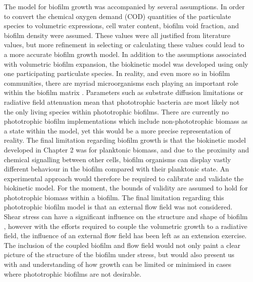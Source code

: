 The model for biofilm growth was accompanied by several assumptions. In order to convert the chemical oxygen demand (COD) quantities of the particulate species to volumetric expressions, cell water content, biofilm void fraction, and biofilm density were assumed. These values were all justified from literature values, but more refinement in selecting or calculating these values could lead to a more accurate biofilm growth model. In addition to the assumptions associated with volumetric biofilm expansion, the biokinetic model was developed using only one participating particulate species. In reality, and even more so in biofilm communities, there are myriad microorganisms each playing an important role within the biofilm matrix \cite{donlan2002}. Parameters such as substrate diffusion limitations or radiative field attenuation mean that phototrophic bacteria are most likely not the only living species within phototrophic biofilms. There are currently no phototrophic biofilm implementations which include non-phototrophic biomass as a state within the model, yet this would be a more precise representation of reality. The final limitation regarding biofilm growth is that the biokinetic model developed in Chapter 2 was for planktonic biomass, and due to the proximity and chemical signalling between other cells, biofilm organisms can display vastly different behaviour in the biofilm compared with their planktonic state. An experimental approach would therefore be required to calibrate and validate the biokinetic model. For the moment, the bounds of validity are assumed to hold for phototrophic biomass within a biofilm. 
\skippingparagraph
The final limitation regarding this phototrophic biofilm model is that an external flow field was not considered. Shear stress can have a significant influence on the structure and shape of biofilm \cite{donlan2002}, however with the efforts required to couple the volumetric growth to a radiative field, the influence of an external flow field has been left as an extension exercise. The inclusion of the coupled biofilm and flow field would not only paint a clear picture of the structure of the biofilm under stress, but would also present us with and understanding of how growth can be limited or minimised in cases where phototrophic biofilms are not desirable. 



